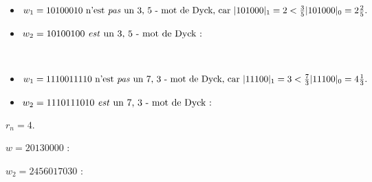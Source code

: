 \begin{example}[Définition 11 : $a < b : a = 3, b = 5$]
    ~
    \begin{itemize}
        \item $w_1 = 10100010 \text{ n'est \emph{pas} un 3, 5 - mot de
        Dyck, car } |101000|_1 = 2 < \frac{3}{5}|101000|_0 = 2 \frac{2}{5}.$
        \item $w_2 = 10100100 \text{ \emph{est} un 3, 5 - mot de Dyck : }$
    \end{itemize}
    
\end{example}

\begin{example}[Définition 11 : $a > b : a = 7, b = 3$]
    ~
    \begin{itemize}
        \item $w_1 = 1110011110 \text{ n'est \emph{pas} un 7, 3 - mot de
        Dyck, car } |11100|_1 = 3 < \frac{7}{3}|11100|_0 = 4 \frac{1}{3}.$
        \item $w_2 = 1110111010 \text{ \emph{est} un 7, 3 - mot de Dyck : }$
    \end{itemize}
    
\end{example}

\begin{example}[Théorème 8 : $a = 7, b = 2$]
    $r_n = 4$.
    \begin{center}
        
    \end{center}
\end{example}

\begin{example}[Définition 12 : $a < b : a = 3, b = 5$]
    $w = 20130000$ :\\
    
   \end{example}

\begin{example}[Définition 12 : $a > b : a = 7, b = 3$]
    $w_2 = 2456017030$ :\\
 
\end{example}

